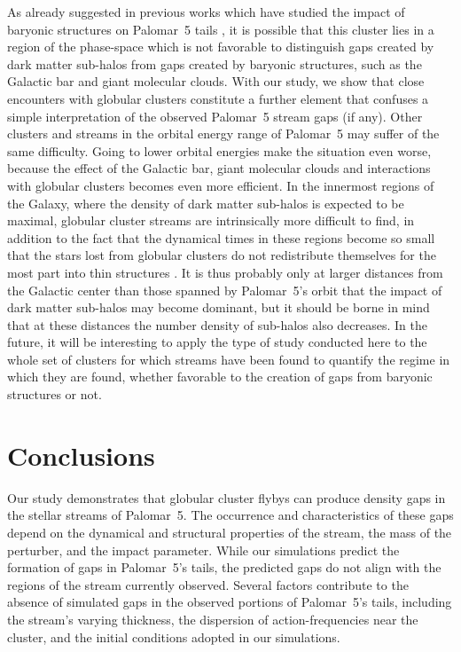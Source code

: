 \documentclass{aa}
\begin{document}
  As already suggested in previous works which have studied the impact of baryonic structures on Palomar~5 tails \citep{2017NatAs...1..633P, 2019MNRAS.484.2009B}, it is possible that this cluster lies in a region of the phase-space which is not favorable to distinguish gaps created by dark matter sub-halos from gaps created by baryonic structures, such as the Galactic bar and giant molecular clouds. With our study, we show that close encounters with globular clusters constitute a further element that confuses a simple interpretation of the observed Palomar~5 stream gaps (if any). Other clusters and streams in the orbital energy range of Palomar~5 may suffer of the same difficulty. Going to lower orbital energies make the situation even worse, because the effect of the Galactic bar, giant molecular clouds and interactions with globular clusters becomes even more efficient. In the innermost regions of the Galaxy, where the density of dark matter sub-halos is expected to be maximal, globular cluster streams are intrinsically more difficult to find, in addition to the fact that the dynamical times in these regions become so small that the stars lost from globular clusters do not redistribute themselves for the most part into thin structures \citep[see][]{2023A&A...673A..44F}. It is thus probably only at larger distances from the Galactic center than those spanned by Palomar~5's orbit that the impact of dark matter sub-halos may become dominant, but it should be borne in mind that at these distances the number density of sub-halos also decreases. In the future, it will be interesting to apply the type of study conducted here to the whole set of clusters for which streams have been found to quantify the regime in which they are found, whether favorable to the creation of gaps from baryonic structures or not.
  

  
\section{Conclusions}
  Our study demonstrates that globular cluster flybys can produce density gaps in the stellar streams of Palomar~5. The occurrence and characteristics of these gaps depend on the dynamical and structural properties of the stream, the mass of the perturber, and the impact parameter. While our simulations predict the formation of gaps in Palomar~5's tails, the predicted gaps do not align with the regions of the stream currently observed. Several factors contribute to the absence of simulated gaps in the observed portions of Palomar~5's tails, including the stream's varying thickness, the dispersion of action-frequencies near the cluster, and the initial conditions adopted in our simulations. 
\end{document}
